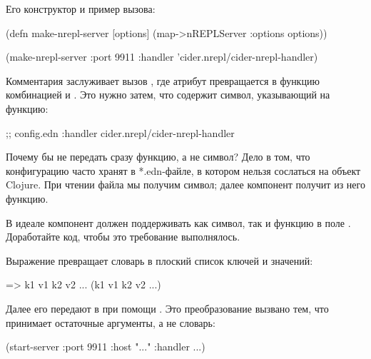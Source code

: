 Его конструктор и пример вызова:

\begin{english}
  \begin{clojure}
(defn make-nrepl-server [options]
  (map->nREPLServer {:options options}))

(make-nrepl-server
 {:port 9911
  :handler 'cider.nrepl/cider-nrepl-handler})
  \end{clojure}
\end{english}

Комментария заслуживает вызов , где атрибут  превращается в функцию комбинацией  и . Это нужно затем, что  содержит символ, указывающий на функцию:

\begin{english}
  \begin{clojure}
;; config.edn
{:handler cider.nrepl/cider-nrepl-handler}
  \end{clojure}
\end{english}

Почему бы не передать сразу функцию, а не символ? Дело в том, что конфигурацию часто хранят в *.edn-файле, в котором нельзя сослаться на объект Clojure. При чтении файла мы получим символ; далее компонент получит из него функцию.

В идеале компонент должен поддерживать как символ, так и функцию в поле . Доработайте код, чтобы это требование выполнялось.

Выражение  превращает словарь в плоский список ключей и значений:

\begin{english}
  \begin{clojure}
=> {k1 v1 k2 v2 ...}
(k1 v1 k2 v2 ...)
  \end{clojure}
\end{english}

Далее его передают в  при помощи . Это преобразование вызвано тем, что  принимает остаточные аргументы, а не словарь:

\begin{english}
  \begin{clojure}
(start-server :port 9911 :host "..." :handler ...)
  \end{clojure}
\end{english}

\def\urlmaparg{https://clojure.org/news/2021/03/18/apis-serving-people-and-programs}

